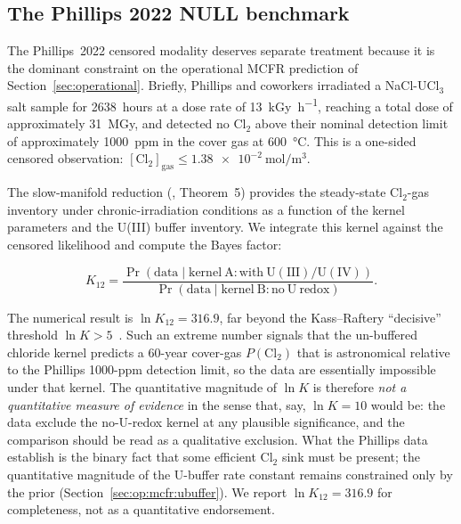 \documentclass[11pt]{article}
\theoremstyle{plain}
\theoremstyle{definition}
\theoremstyle{remark}
\begin{document}
\subsection{The Phillips 2022 NULL benchmark}\label{sec:val:phillips}

The Phillips~2022 censored modality deserves separate treatment because it
is the dominant constraint on the operational MCFR prediction of
Section~\ref{sec:operational}.  Briefly, Phillips and coworkers irradiated
a NaCl-UCl$_3$ salt sample for \SI{2638}{hours} at a dose rate of
\SI{13}{\kilo\gray\per\hour}, reaching a total dose of approximately
\SI{31}{\mega\gray}, and detected no Cl$_2$ above their nominal detection
limit of approximately \SI{1000}{ppm} in the cover gas at \SI{600}{\celsius}.
This is a one-sided censored observation: $[\mathrm{Cl}_2]_{\mathrm{gas}}
\leq \SI{1.38e-2}{\mol\per\meter\cubed}$.

The slow-manifold reduction (\citealp{Tanore2026PaperI}, Theorem~5)
provides the steady-state Cl$_2$-gas inventory under chronic-irradiation
conditions as a function of the kernel parameters and the U(III) buffer
inventory.  We integrate this kernel against the censored likelihood and
compute the Bayes factor:

\begin{equation}
K_{12} = \frac{\Pr(\mathrm{data} \mid \mathrm{kernel\ A: with\ U(III)/U(IV)})}
              {\Pr(\mathrm{data} \mid \mathrm{kernel\ B: no\ U\ redox})}.
\label{eq:bayesfactor}
\end{equation}

The numerical result is $\ln K_{12} = 316.9$, far beyond the
Kass--Raftery ``decisive'' threshold $\ln K > 5$~\citep{Kass1995}.  Such
an extreme number signals that the un-buffered chloride kernel predicts
a 60-year cover-gas $P(\mathrm{Cl}_2)$ that is astronomical relative to
the Phillips 1000-ppm detection limit, so the data are essentially
impossible under that kernel.  The quantitative magnitude of $\ln K$ is
therefore \emph{not a quantitative measure of evidence} in the sense
that, say, $\ln K = 10$ would be: the data exclude the no-U-redox kernel
at any plausible significance, and the comparison should be read as a
qualitative exclusion.  What the Phillips data establish is the binary
fact that some efficient Cl$_2$ sink must be present; the quantitative
magnitude of the U-buffer rate constant remains constrained only by the
prior (Section~\ref{sec:op:mcfr:ubuffer}).  We report
$\ln K_{12} = 316.9$ for completeness, not as a quantitative endorsement.
\end{document}
